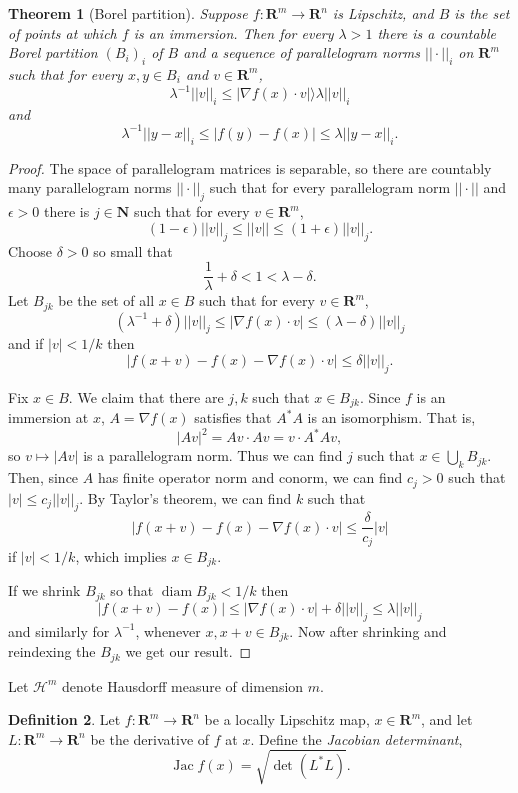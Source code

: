 \documentclass[reqno,12pt,letterpaper]{amsart}
\newcommand{\NN}{\mathbf{N}}
\newcommand{\RR}{\mathbf{R}}
\DeclareMathOperator{\diam}{diam}
\DeclareMathOperator{\Jac}{Jac}
\newcommand{\dfn}[1]{\emph{#1}\index{#1}}
\newtheorem{theorem}{Theorem}[section]
\theoremstyle{definition}
\newtheorem{definition}[theorem]{Definition}
\numberwithin{equation}{section}
\begin{document}
\begin{theorem}[Borel partition]
Suppose $f: \RR^m \to \RR^n$ is Lipschitz, and $B$ is the set of points at which $f$ is an immersion.
Then for every $\lambda > 1$ there is a countable Borel partition $(B_i)_i$ of $B$ and a sequence of parallelogram norms $||\cdot||_i$ on $\RR^m$ such that for every $x,y \in B_i$ and $v \in \RR^m$,
$$\lambda^{-1} ||v||_i \leq |\nabla f(x) \cdot v| \rangle \lambda ||v||_i$$
and
$$\lambda^{-1} ||y - x||_i \leq |f(y) - f(x)| \leq \lambda ||y - x||_i.$$
\end{theorem}
\begin{proof}
The space of parallelogram matrices is separable, so there are countably many parallelogram norms $||\cdot||_j$ such that for every parallelogram norm $||\cdot||$ and $\epsilon > 0$ there is $j \in \NN$ such that for every $v \in \RR^m$,
$$(1 - \epsilon) ||v||_j \leq ||v|| \leq (1 + \epsilon) ||v||_j.$$
Choose $\delta > 0$ so small that
$$\frac{1}{\lambda} + \delta < 1 < \lambda - \delta.$$
Let $B_{jk}$ be the set of all $x \in B$ such that for every $v \in \RR^m$,
$$(\lambda^{-1} + \delta)||v||_j \leq |\nabla f(x) \cdot v| \leq (\lambda - \delta) ||v||_j$$
and if $|v| < 1/k$ then
$$|f(x + v) - f(x) - \nabla f(x) \cdot v| \leq \delta ||v||_j.$$

Fix $x \in B$. We claim that there are $j,k$ such that $x \in B_{jk}$.
Since $f$ is an immersion at $x$, $A = \nabla f(x)$ satisfies that $A^*A$ is an isomorphism. That is,
$$|Av|^2 = Av \cdot Av = v \cdot A^*A v,$$
so $v \mapsto |Av|$ is a parallelogram norm.
Thus we can find $j$ such that $x \in \bigcup_k B_{jk}$.
Then, since $A$ has finite operator norm and conorm, we can find $c_j > 0$ such that $|v| \leq c_j ||v||_j$.
By Taylor's theorem, we can find $k$ such that
$$|f(x + v) - f(x) - \nabla f(x) \cdot v| \leq \frac{\delta}{c_j} |v|$$
if $|v| < 1/k$, which implies $x \in B_{jk}$.

If we shrink $B_{jk}$ so that $\diam B_{jk} < 1/k$ then
$$|f(x + v) - f(x)| \leq |\nabla f(x) \cdot v| + \delta ||v||_j \leq \lambda ||v||_j$$
and similarly for $\lambda^{-1}$, whenever $x, x + v \in B_{jk}$.
Now after shrinking and reindexing the $B_{jk}$ we get our result.
\end{proof}

Let $\mathcal H^m$ denote Hausdorff measure of dimension $m$.

\begin{definition}
Let $f: \RR^m \to \RR^n$ be a locally Lipschitz map, $x \in \RR^m$, and let $L: \RR^m \to \RR^n$ be the derivative of $f$ at $x$.
Define the \dfn{Jacobian determinant},
$$\Jac f(x) = \sqrt{\det(L^*L)}.$$
\end{definition}
\end{document}
